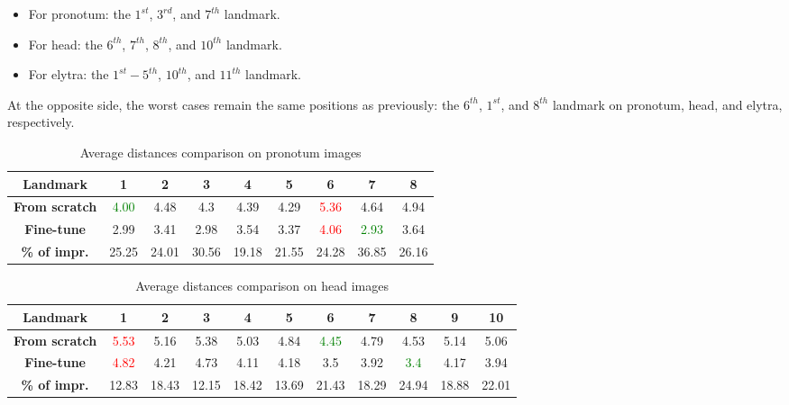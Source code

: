 \documentclass[review]{elsarticle}
\begin{document}
\begin{itemize}
	\item For pronotum: the $1^{st}$, $3^{rd}$, and $7^{th}$ landmark.
	\item For head: the $6^{th}$, $7^{th}$, $8^{th}$, and $10^{th}$ landmark.
	\item For elytra: the $1^{st} - 5 ^{th}$, $10^{th}$, and $11^{th}$ landmark.
\end{itemize}

At the opposite side, the worst cases remain the same positions as previously: the $6^{th}$, $1^{st}$, and $8^{th}$ landmark on pronotum, head, and elytra, respectively.

\begin{table}[h!]
	\centering
	\begin{tabular}{| c | c | c | c | c | c | c | c | c |}
		\hline
		\textbf{Landmark} & 1 & 2 & 3 & 4 & 5 & 6 & 7 & 8 \\ \hline
		\textbf{From scratch} & \textcolor{green}{4.00} & 4.48 & 4.3 & 4.39 & 4.29 & \textcolor{red}{5.36} & 4.64 & 4.94 \\ \hline
		\textbf{Fine-tune} & 2.99 & 3.41 & 2.98 & 3.54 & 3.37 & \textcolor{red}{4.06} & \textcolor{green}{2.93} & 3.64 \\ \hline
		\textbf{\% of impr.} & 25.25 & 24.01 & 30.56 & 19.18 & 21.55 & 24.28 & 36.85 & 26.16 \\ \hline
	\end{tabular}
	\caption{Average distances comparison on pronotum images}
	\label{tblfn_pronotum}
\end{table}

\begin{table}[h!]
	\centering
	\begin{tabular}{| c | c | c | c | c | c | c | c | c | c | c |}
		\hline
		\textbf{Landmark} & 1 & 2 & 3 & 4 & 5 & 6 & 7 & 8 & 9 & 10 \\ \hline
		\textbf{From scratch} & \textcolor{red}{5.53} & 5.16 & 5.38 & 5.03 & 4.84 & \textcolor{green}{4.45} & 4.79 & 4.53 & 5.14 & 5.06 \\ \hline
		\textbf{Fine-tune} & \textcolor{red}{4.82} & 4.21 & 4.73 & 4.11 & 4.18 & 3.5 & 3.92 & \textcolor{green}{3.4} & 4.17 & 3.94 \\ \hline
		\textbf{\% of impr.} & 12.83 & 18.43 & 12.15 & 18.42 & 13.69 & 21.43 & 18.29 & 24.94 & 18.88 & 22.01 \\ \hline
	\end{tabular}
	\caption{Average distances comparison on head images}
	\label{tblfn_head}
\end{table}
\end{document}
